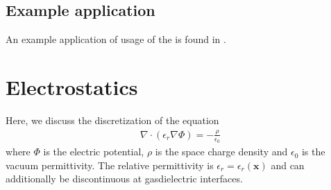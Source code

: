 \documentclass[letterpaper,10pt,english]{sphinxmanual}
\begin{document}
\begin{sphinxVerbatim}[commandchars=\\\{\},formatcom=\scriptsize]
   
          

   
                   
        
         
\end{sphinxVerbatim}


\subsection{Example application}
\label{\detokenize{Solvers/CDR:example-application}}
An example application of usage of the  is found in {\hyperref[\detokenize{Applications/AdvectionDiffusionModel:chap-advectiondiffusionmodel}]{}}.


\section{Electrostatics}
\label{\detokenize{Solvers/Electrostatics:electrostatics}}\label{\detokenize{Solvers/Electrostatics:chap-electrostatics}}\label{\detokenize{Solvers/Electrostatics::doc}}
Here, we discuss the discretization of the equation
\begin{equation}\label{equation:Solvers/Electrostatics:Poisson}
\begin{split}\nabla\cdot\left(\epsilon_r\nabla\Phi\right) = -\frac{\rho}{\epsilon_0}\end{split}
\end{equation}
where \(\Phi\) is the electric potential, \(\rho\) is the space charge density and \(\epsilon_0\) is the vacuum permittivity.
The relative permittivity is \(\epsilon_r = \epsilon_r\left(\mathbf{x}\right)\) and can additionally be discontinuous at gas\sphinxhyphen{}dielectric interfaces.
\end{document}
